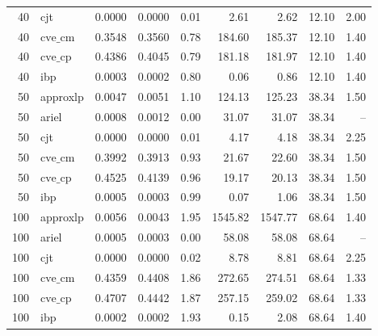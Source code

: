 \documentclass{article}
\begin{document}
\begin{table}[ht]
\begin{tabular}{rlrrrrrrr}
 40 & cjt & 0.0000 & 0.0000 & 0.01 & 2.61 & 2.62 & 12.10 & 2.00 \\
 40 & $\text{cve\_cm}$ & 0.3548 & 0.3560 & 0.78 & 184.60 & 185.37 & 12.10 & 1.40 \\
 40 & $\text{cve\_cp}$ & 0.4386 & 0.4045 & 0.79 & 181.18 & 181.97 & 12.10 & 1.40 \\
 40 & ibp & 0.0003 & 0.0002 & 0.80 & 0.06 & 0.86 & 12.10 & 1.40 \\
\hline
 50 & approxlp & 0.0047 & 0.0051 & 1.10 & 124.13 & 125.23 & 38.34 & 1.50 \\
 50 & ariel & 0.0008 & 0.0012 & 0.00 & 31.07 & 31.07 & 38.34 & -- \\
 50 & cjt & 0.0000 & 0.0000 & 0.01 & 4.17 & 4.18 & 38.34 & 2.25 \\
 50 & $\text{cve\_cm}$ & 0.3992 & 0.3913 & 0.93 & 21.67 & 22.60 & 38.34 & 1.50 \\
 50 & $\text{cve\_cp}$ & 0.4525 & 0.4139 & 0.96 & 19.17 & 20.13 & 38.34 & 1.50 \\
 50 & ibp & 0.0005 & 0.0003 & 0.99 & 0.07 & 1.06 & 38.34 & 1.50 \\
\hline
 100 & approxlp & 0.0056 & 0.0043 & 1.95 & 1545.82 & 1547.77 & 68.64 & 1.40 \\
 100 & ariel & 0.0005 & 0.0003 & 0.00 & 58.08 & 58.08 & 68.64 & -- \\
 100 & cjt & 0.0000 & 0.0000 & 0.02 & 8.78 & 8.81 & 68.64 & 2.25 \\
 100 & $\text{cve\_cm}$ & 0.4359 & 0.4408 & 1.86 & 272.65 & 274.51 & 68.64 & 1.33 \\
 100 & $\text{cve\_cp}$ & 0.4707 & 0.4442 & 1.87 & 257.15 & 259.02 & 68.64 & 1.33 \\
 100 & ibp & 0.0002 & 0.0002 & 1.93 & 0.15 & 2.08 & 68.64 & 1.40 \\
\bottomrule
\end{tabular}
\end{table}

\newpage
\end{document}
